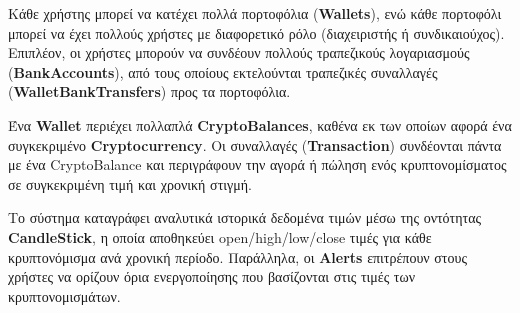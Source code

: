 \documentclass[a4paper,12pt]{article}
\begin{document}
Κάθε χρήστης μπορεί να κατέχει πολλά πορτοφόλια
(\textbf{Wallets}), ενώ κάθε πορτοφόλι μπορεί να έχει πολλούς
χρήστες με διαφορετικό ρόλο (διαχειριστής ή συνδικαιούχος). Επιπλέον, οι χρήστες μπορούν να
συνδέουν πολλούς τραπεζικούς λογαριασμούς (\textbf{BankAccounts}),
από τους οποίους εκτελούνται τραπεζικές συναλλαγές 
(\textbf{WalletBankTransfers}) προς τα πορτοφόλια.

Ένα \textbf{Wallet} περιέχει πολλαπλά \textbf{CryptoBalances}, καθένα εκ των οποίων αφορά ένα
συγκεκριμένο \textbf{Cryptocurrency}. Οι συναλλαγές (\textbf{Transaction}) συνδέονται πάντα με ένα 
CryptoBalance και περιγράφουν την αγορά ή πώληση ενός κρυπτονομίσματος σε συγκεκριμένη τιμή και
χρονική στιγμή.

Το σύστημα καταγράφει αναλυτικά ιστορικά δεδομένα τιμών μέσω της οντότητας
\textbf{CandleStick}, η οποία αποθηκεύει open/high/low/close τιμές για κάθε κρυπτονόμισμα ανά
χρονική περίοδο. Παράλληλα, οι \textbf{Alerts} επιτρέπουν στους χρήστες να ορίζουν όρια ενεργοποίησης
που βασίζονται στις τιμές των κρυπτονομισμάτων.
\end{document}
